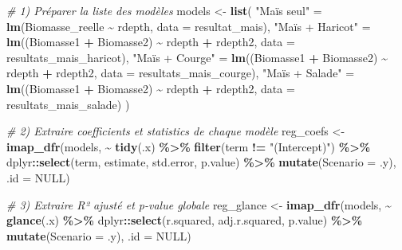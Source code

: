 \documentclass[
]{article}
\newenvironment{Shaded}{\begin{snugshade}}{\end{snugshade}}
\newcommand{\AttributeTok}[1]{\textcolor[rgb]{0.13,0.29,0.53}{#1}}
\newcommand{\CommentTok}[1]{\textcolor[rgb]{0.56,0.35,0.01}{\textit{#1}}}
\newcommand{\ConstantTok}[1]{\textcolor[rgb]{0.56,0.35,0.01}{#1}}
\newcommand{\FunctionTok}[1]{\textcolor[rgb]{0.13,0.29,0.53}{\textbf{#1}}}
\newcommand{\NormalTok}[1]{#1}
\newcommand{\OtherTok}[1]{\textcolor[rgb]{0.56,0.35,0.01}{#1}}
\newcommand{\SpecialCharTok}[1]{\textcolor[rgb]{0.81,0.36,0.00}{\textbf{#1}}}
\newcommand{\StringTok}[1]{\textcolor[rgb]{0.31,0.60,0.02}{#1}}
\begin{document}
\begin{Shaded}
\begin{Highlighting}[]
\CommentTok{\# 1) Préparer la liste des modèles}
\NormalTok{models }\OtherTok{\textless{}{-}} \FunctionTok{list}\NormalTok{(}
  \StringTok{"Maïs seul"}       \OtherTok{=} \FunctionTok{lm}\NormalTok{(Biomasse\_reelle              }\SpecialCharTok{\textasciitilde{}}\NormalTok{ rdepth,             }\AttributeTok{data =}\NormalTok{ resultat\_mais),}
  \StringTok{"Maïs + Haricot"}  \OtherTok{=} \FunctionTok{lm}\NormalTok{((Biomasse1 }\SpecialCharTok{+}\NormalTok{ Biomasse2)     }\SpecialCharTok{\textasciitilde{}}\NormalTok{ rdepth }\SpecialCharTok{+}\NormalTok{ rdepth2,   }\AttributeTok{data =}\NormalTok{ resultats\_mais\_haricot),}
  \StringTok{"Maïs + Courge"}   \OtherTok{=} \FunctionTok{lm}\NormalTok{((Biomasse1 }\SpecialCharTok{+}\NormalTok{ Biomasse2)     }\SpecialCharTok{\textasciitilde{}}\NormalTok{ rdepth }\SpecialCharTok{+}\NormalTok{ rdepth2,   }\AttributeTok{data =}\NormalTok{ resultats\_mais\_courge),}
  \StringTok{"Maïs + Salade"}   \OtherTok{=} \FunctionTok{lm}\NormalTok{((Biomasse1 }\SpecialCharTok{+}\NormalTok{ Biomasse2)     }\SpecialCharTok{\textasciitilde{}}\NormalTok{ rdepth }\SpecialCharTok{+}\NormalTok{ rdepth2,   }\AttributeTok{data =}\NormalTok{ resultats\_mais\_salade)}
\NormalTok{)}

\CommentTok{\# 2) Extraire coefficients et statistics de chaque modèle}
\NormalTok{reg\_coefs }\OtherTok{\textless{}{-}} 
  \FunctionTok{imap\_dfr}\NormalTok{(models, }\SpecialCharTok{\textasciitilde{}} \FunctionTok{tidy}\NormalTok{(.x) }\SpecialCharTok{\%\textgreater{}\%} 
             \FunctionTok{filter}\NormalTok{(term }\SpecialCharTok{!=} \StringTok{"(Intercept)"}\NormalTok{) }\SpecialCharTok{\%\textgreater{}\%} 
\NormalTok{             dplyr}\SpecialCharTok{::}\FunctionTok{select}\NormalTok{(term, estimate, std.error, p.value) }\SpecialCharTok{\%\textgreater{}\%} 
             \FunctionTok{mutate}\NormalTok{(}\AttributeTok{Scenario =}\NormalTok{ .y),}
           \AttributeTok{.id =} \ConstantTok{NULL}\NormalTok{)}

\CommentTok{\# 3) Extraire R² ajusté et p{-}value globale}
\NormalTok{reg\_glance }\OtherTok{\textless{}{-}} 
  \FunctionTok{imap\_dfr}\NormalTok{(models, }\SpecialCharTok{\textasciitilde{}} \FunctionTok{glance}\NormalTok{(.x) }\SpecialCharTok{\%\textgreater{}\%} 
\NormalTok{             dplyr}\SpecialCharTok{::}\FunctionTok{select}\NormalTok{(r.squared, adj.r.squared, p.value) }\SpecialCharTok{\%\textgreater{}\%} 
             \FunctionTok{mutate}\NormalTok{(}\AttributeTok{Scenario =}\NormalTok{ .y),}
           \AttributeTok{.id =} \ConstantTok{NULL}\NormalTok{)}


\end{Highlighting}
\end{Shaded}
\end{document}
